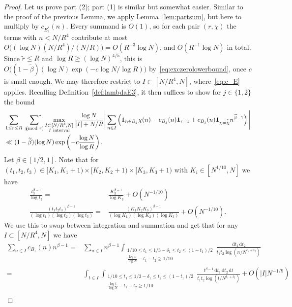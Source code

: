 \documentclass[12pt]{amsart}
\theoremstyle{definition}
\theoremstyle{remark}
\numberwithin{equation}{section}
\newcommand{\asum}{\sideset{}{^{\ast}}\sum}
\newcommand{\1}{\mathbf{1}}
\renewcommand\d{\,\mathrm{d}}
\let\oldpmod\pmod
\renewcommand{\pmod}[1]{\hspace{-0.12cm}\oldpmod {#1}}
\begin{document}
\begin{proof}
Let us prove part (2); part (1) is similar but somewhat easier. Similar to the proof of the previous Lemma, we apply Lemma~\ref{lem:partsum}, but here to multiply by $c_{E_3^*}(n)$. Every summand is $O(1)$, so for each pair $(r,\chi)$ the terms with $n<N/R^4$ contribute at most $O\bigl((\log N)(N/R^4)/(N/R)\bigr)=O(R^{-3}\log N)$, and $O(R^{-1}\log N)$ in total. Since $\widetilde{r}\leq R$ and $\log R\geq (\log N)^{4/5}$, this is $O\bigl((1-\widetilde{\beta})(\log N)\exp(-c\log N/\log R)\bigr)$ by~\eqref{eq:exczerolowerbound}, once $c$ is small enough. We may therefore restrict to $I\subset [N/R^4,N]$, where~\eqref{eq:c_E} applies. Recalling Definition~\ref{def:lambdaE3}, it then suffices to show for $j\in \{1,2\}$ the bound
\begin{align*} 
    &\sum_{1\leq r\leq R}\,\,\,\asum_{\chi\pmod r}\max_{\substack{I\subset [N/R^4,N]\\I \textnormal{ interval}}}\frac{\log N}{|I|+N/R} \Bigg|\sum_{n\in I}\left(\1_{n\in B_j}\chi(n)-c_{B_j}(n)\1_{r=1}+c_{B_j}(n)\1_{\chi=\widetilde{\chi}}n^{\widetilde{\beta}-1}\right)\Bigg|\\
				&\ll  (1-\widetilde{\beta})(\log N)\exp\left(-c \frac{\log N}{\log R}\right).
\end{align*}
Let $\beta\in[1/2,1]$. Note that for $(t_1,t_2,t_3)\in [K_1,K_1+1)\times [K_2,K_2+1)\times [K_3,K_3+1)$ with $K_i\in [N^{1/10}, N]$ we have 
  \begin{align*}
  \frac{t_3^{\beta-1}}{\log t_3}=&\frac{K_3^{\beta-1}}{\log K_3}+O(N^{-1/10})  \\
   \frac{(t_1t_2t_3)^{\beta-1}}{(\log t_1)(\log t_2)(\log t_3)}=&\frac{(K_1K_2K_3)^{\beta-1}}{(\log K_1)(\log K_2)(\log K_3)}+O(N^{-1/10})  .
  \end{align*}
We use this to swap between integration and summation and get that for any $I\subset [N/R^4,N]$ we have
\begin{align*}
    \sum_{n\in I} c_{B_1}(n) n^{\beta-1}=& \sum_{n\in I} n^{\beta-1} \int_{\substack{1/10\leq t_1\leq 1/3-\delta_1\leq t_2\leq (1-t_1)/2\\ \frac{\log n}{\log N}-t_1-t_2\geq 1/10}}\frac{\d t_1 \d t_2}{t_1t_2\log (n/N^{t_1+t_2})}\\
    =& \int_{t\in I} \int_{\substack{1/10\leq t_1\leq 1/3-\delta_1\leq t_2\leq (1-t_1)/2\\ \frac{\log t}{\log N}-t_1-t_2\geq 1/10}}\frac{t^{\beta-1} \d t_1 \d t_2 \d t}{t_1t_2\log (t/N^{t_1+t_2})}+O(|I|N^{-1/9})\\

\end{align*}
\end{proof}
\end{document}
